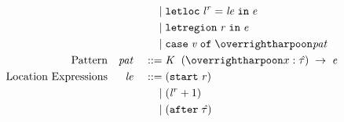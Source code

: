 \begin{displaymath}
\begin{aligned}
    && && \gramor & \letloc{\locreg{\loc}{\reg}}{\LE}{\EXPR} \\
    && && \gramor & \letreg{\reg}{\EXPR} \\
    && && \gramor & \case{\VAL}{\overharpoon{\pat}} \\
    \textup{Pattern} && \pat && \gramdef &
    \caseclause{\datacon{\DC}{}{(\overharpoon{\var : \hTYP})}}{\EXPR} \\
    \textup{Location Expressions} && \LE && \gramdef
    & \startr{\reg} \\
    && && \gramor & (\locreg{\loc}{r} + 1) \\
    && && \gramor & \afterl{\hTYP}
  \end{aligned}
\end{displaymath}
